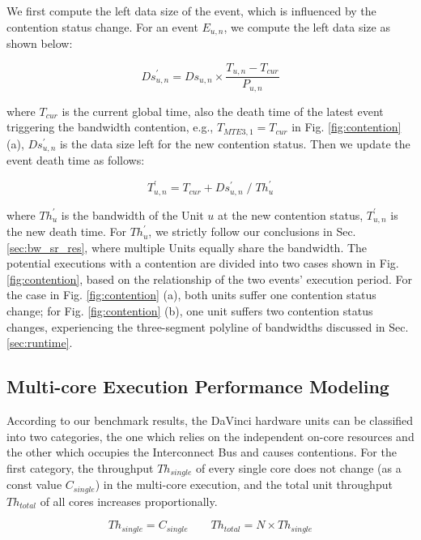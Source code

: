 \documentclass[12pt]{extbook}
\begin{document}
We first compute the left data size of the event, which is influenced by the contention status change. For an event $E_{u, n}$, we compute the left data size as shown below:

\begin{equation}
Ds^{\prime}_{u, n} = Ds_{u, n} \times \frac{T_{u, n} - T_{cur}}{P_{u, n}}
\end{equation}

where $T_{cur}$ is the current global time, also the death time of the latest event triggering the bandwidth contention, e.g., $T_{MTE3, 1} = T_{cur}$ in Fig. \ref{fig:contention} (a), $Ds^{\prime}_{u, n}$ is the data size left for the new contention status. Then we update the event death time as follows:

\begin{equation}
T^{\prime}_{u, n} = T_{cur} + Ds^{\prime}_{u,n}\;/\;Th^{\prime}_{u}
\end{equation}

where $Th^{\prime}_{u}$ is the bandwidth of the Unit $u$ at the new contention status, $T^{\prime}_{u, n}$ is the new death time. For $Th^{\prime}_{u}$, we strictly follow our conclusions in Sec. \ref{sec:bw_sr_res}, where multiple Units equally share the bandwidth. The potential executions with a contention are divided into two cases shown in Fig. \ref{fig:contention}, based on the relationship of the two events' execution period. For the case in Fig. \ref{fig:contention} (a), both units suffer one contention status change; for Fig. \ref{fig:contention} (b), one unit suffers two contention status changes, experiencing the three-segment polyline of bandwidths discussed in Sec. \ref{sec:runtime}. 

\subsection{Multi-core Execution Performance Modeling \label{sec:multi-core}}

According to our benchmark results, the DaVinci hardware units can be classified into two categories, the one which relies on the independent on-core resources and the other which occupies the Interconnect Bus and causes contentions. For the first category, the throughput $Th_{single}$ of every single core does not change (as a const value $C_{single}$) in the multi-core execution, and the total unit throughput $Th_{total}$ of all cores increases proportionally.

\begin{equation}
\label{eq:first}
Th_{single} = C_{single} \qquad Th_{total} = N \times Th_{single}
\end{equation}
\end{document}
